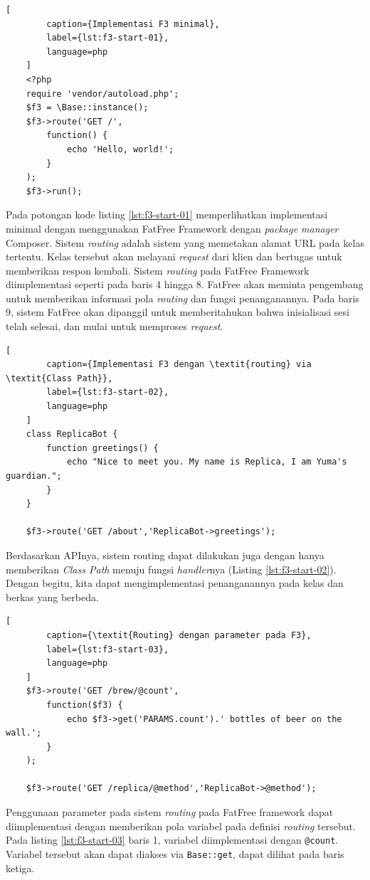     \begin{lstlisting}[
        caption={Implementasi F3 minimal},
        label={lst:f3-start-01},
        language=php
    ]
    <?php
    require 'vendor/autoload.php';
    $f3 = \Base::instance();
    $f3->route('GET /',
        function() {
            echo 'Hello, world!';
        }
    );
    $f3->run();
    \end{lstlisting}
    
    Pada potongan kode listing \ref{lst:f3-start-01} memperlihatkan implementasi
    minimal dengan menggunakan FatFree Framework dengan \textit{package manager}
    Composer. Sistem \textit{routing} adalah sistem yang memetakan alamat URL pada
    kelas tertentu. Kelas tersebut akan melayani \textit{request} dari klien dan
    bertugas untuk memberikan respon kembali. Sistem \textit{routing} pada FatFree 
    Framework
    diimplementasi seperti pada baris 4 hingga 8. FatFree akan meminta
    pengembang untuk memberikan informasi pola \textit{routing} dan fungsi
    penanganannya. Pada baris 9, sistem FatFree akan dipanggil untuk
    memberitahukan bahwa inisialisasi sesi telah selesai, dan mulai untuk memproses
    \textit{request}.
    
    \begin{lstlisting}[
        caption={Implementasi F3 dengan \textit{routing} via \textit{Class Path}},
        label={lst:f3-start-02},
        language=php
    ]
    class ReplicaBot {
        function greetings() {
            echo "Nice to meet you. My name is Replica, I am Yuma's guardian.";
        }
    }
    
    $f3->route('GET /about','ReplicaBot->greetings');
    \end{lstlisting}

    Berdasarkan APInya, sistem routing dapat dilakukan juga dengan hanya
    memberikan \textit{Class Path} menuju fungsi \textit{handler}nya (Listing
    \ref{lst:f3-start-02}). Dengan begitu, kita dapat mengimplementasi
    penanganannya pada kelas dan berkas yang berbeda.
    
    \begin{lstlisting}[
        caption={\textit{Routing} dengan parameter pada F3},
        label={lst:f3-start-03},
        language=php
    ]
    $f3->route('GET /brew/@count',
        function($f3) {
            echo $f3->get('PARAMS.count').' bottles of beer on the wall.';
        }
    );
    
    $f3->route('GET /replica/@method','ReplicaBot->@method');
    \end{lstlisting}
    Penggunaan parameter pada sistem \textit{routing} pada FatFree framework
    dapat diimplementasi dengan memberikan pola variabel pada definisi
    \textit{routing} tersebut. Pada listing \ref{lst:f3-start-03} baris 1,
    variabel diimplementasi dengan
    \texttt{@count}. Variabel tersebut akan dapat diakses via \texttt{Base::get},
    dapat dilihat pada baris ketiga.
    
